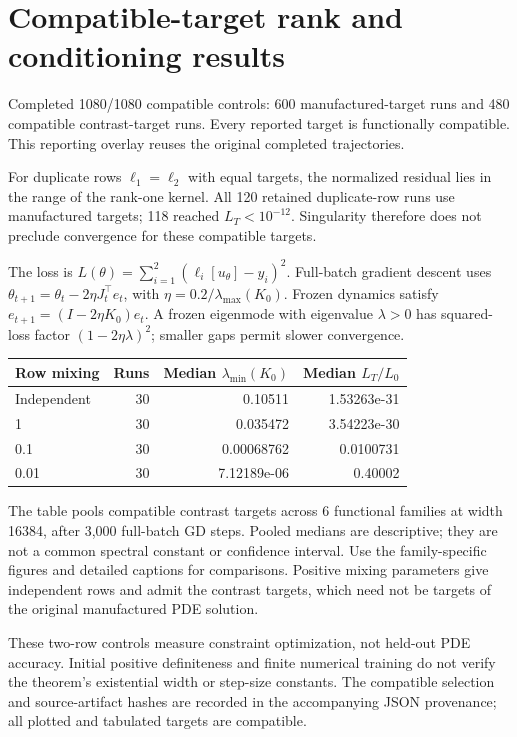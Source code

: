\documentclass[10pt]{article}
\begin{document}
\section*{Compatible-target rank and conditioning results}
Completed 1080/1080 compatible controls: 600 manufactured-target runs and 480 compatible contrast-target runs. Every reported target is functionally compatible. This reporting overlay reuses the original completed trajectories.

For duplicate rows $\ell_1=\ell_2$ with equal targets, the normalized residual lies in the range of the rank-one kernel. All 120 retained duplicate-row runs use manufactured targets; 118 reached $L_T<10^{-12}$. Singularity therefore does not preclude convergence for these compatible targets.

The loss is $L(\theta)=\sum_{i=1}^2(\ell_i[u_\theta]-y_i)^2$. Full-batch gradient descent uses $\theta_{t+1}=\theta_t-2\eta J_t^\top e_t$, with $\eta=0.2/\lambda_{\max}(K_0)$. Frozen dynamics satisfy $e_{t+1}=(I-2\eta K_0)e_t$. A frozen eigenmode with eigenvalue $\lambda>0$ has squared-loss factor $(1-2\eta\lambda)^2$; smaller gaps permit slower convergence.

\begin{center}
\begin{tabular}{lrrr}
\toprule
Row mixing & Runs & Median $\lambda_{\min}(K_0)$ & Median $L_T/L_0$\\
\midrule
Independent & 30 & 0.10511 & 1.53263e-31 \\
1 & 30 & 0.035472 & 3.54223e-30 \\
0.1 & 30 & 0.00068762 & 0.0100731 \\
0.01 & 30 & 7.12189e-06 & 0.40002 \\
\bottomrule
\end{tabular}
\end{center}
The table pools compatible contrast targets across 6 functional families at width 16384, after 3,000 full-batch GD steps. Pooled medians are descriptive; they are not a common spectral constant or confidence interval. Use the family-specific figures and detailed captions for comparisons. Positive mixing parameters give independent rows and admit the contrast targets, which need not be targets of the original manufactured PDE solution.

These two-row controls measure constraint optimization, not held-out PDE accuracy. Initial positive definiteness and finite numerical training do not verify the theorem's existential width or step-size constants. The compatible selection and source-artifact hashes are recorded in the accompanying JSON provenance; all plotted and tabulated targets are compatible.
\end{document}
